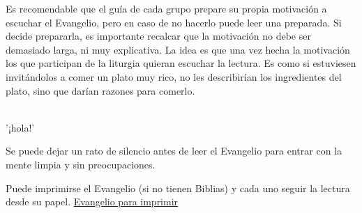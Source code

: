 Es recomendable que el guía de cada grupo prepare su propia motivación a escuchar el Evangelio, pero en caso de no hacerlo puede leer una preparada. Si decide prepararla, es importante recalcar que la motivación no debe ser demasiado larga, ni muy explicativa. La idea es que una vez hecha la motivación los que participan de la liturgia quieran escuchar la lectura. Es como si estuviesen invitándolos a comer un plato muy rico, no les describirían los ingredientes del plato, sino que darían razones para comerlo.

\hfill \\ \hfill
'¡hola!'
\hfill \\ \hfill
    
Se puede dejar un rato de silencio antes de leer el Evangelio para entrar con la mente limpia y sin preocupaciones.
    
Puede imprimirse el Evangelio (si no tienen Biblias) y cada uno seguir la lectura desde su papel. \href{¡link!}{\color{amarillo}Evangelio para imprimir}
\hfill \\ \hfill